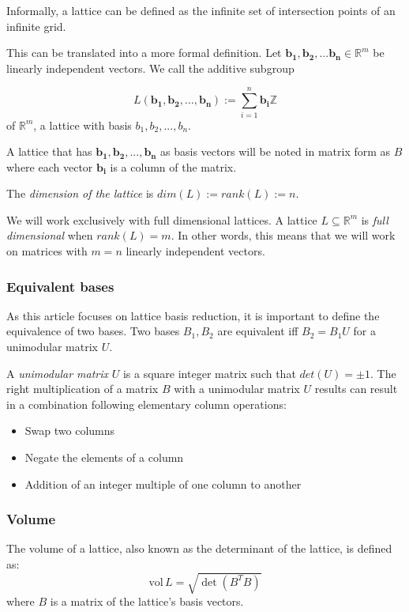 \documentclass[10pt]{article}
\renewcommand{\vec}[1]{\mathbf{#1}}
\begin{document}
Informally, a lattice can be defined as the infinite set of intersection points of an infinite grid.

This can be translated into a more formal definition\cite{SchnorrStanfordNotes}.\newline 
Let $\vec{b_1}, \vec{b_2}, ... \vec{b_n} \in \mathbb{R}^m$ be linearly independent vectors. We call the additive subgroup

\[
L(\vec{b_1}, \vec{b_2},..., \vec{b_n}):= \displaystyle\sum_{i=1}^{n} \vec{b_i} \mathbb{Z}
\] of $\mathbb{R}^m$, a lattice with basis $b_1,b_2,...,b_n$.

A lattice that has $\vec{b_1},\vec{b_2},...,\vec{b_n}$ as basis vectors will be noted in matrix form as $B$ where each vector $\vec{b_i}$ is a column of the matrix.

The \emph{dimension of the lattice} is $dim(L) := rank(L) := n$.

We will work exclusively with full dimensional lattices. A lattice $L \subseteq \mathbb{R}^m$ is \emph{full dimensional} when $rank(L)=m$. In other words, this means that we will work on matrices with $m=n$ linearly independent vectors.

\subsubsection{Equivalent bases}

As this article focuses on lattice basis reduction, it is important to define the equivalence of two bases. Two bases $B_1 , B_2$ are equivalent iff $B_2 = B_1 U$ for a unimodular matrix $U$.

A \emph{unimodular matrix} $U$ is a square integer matrix such that $det(U) = \pm 1$. The right multiplication of a matrix $B$ with a unimodular matrix $U$ results can result in a combination following elementary column operations:
\begin{itemize}
\item Swap two columns
\item Negate the elements of a column
\item Addition of an integer multiple of one column to another
\end{itemize}

\subsubsection{Volume}

The volume of a lattice, also known as the determinant of the lattice, is defined as:
\[
\text{vol} \,L = \sqrt{\det(B^T B)}
\] where $B$ is a matrix of the lattice's basis vectors.
\end{document}

